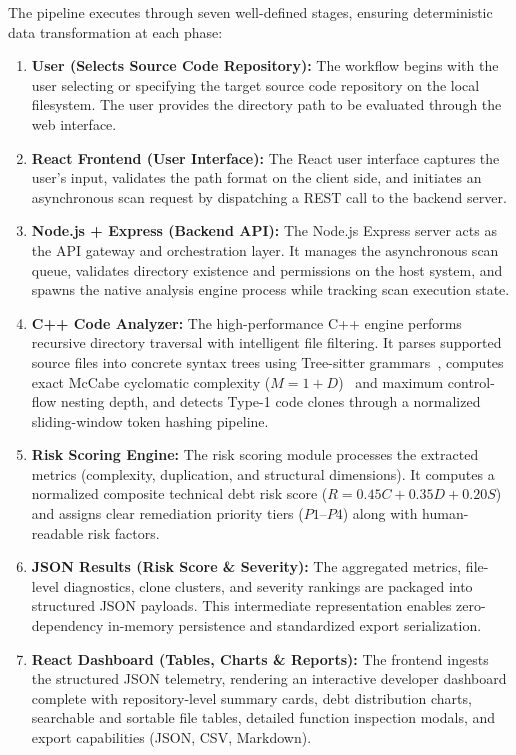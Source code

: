 The pipeline executes through seven well-defined stages, ensuring deterministic data transformation at each phase:
\begin{enumerate}
    \item \textbf{User (Selects Source Code Repository):} The workflow begins with the user selecting or specifying the target source code repository on the local filesystem. The user provides the directory path to be evaluated through the web interface.
    \item \textbf{React Frontend (User Interface):} The React user interface captures the user's input, validates the path format on the client side, and initiates an asynchronous scan request by dispatching a REST call to the backend server.
    \item \textbf{Node.js + Express (Backend API):} The Node.js Express server acts as the API gateway and orchestration layer. It manages the asynchronous scan queue, validates directory existence and permissions on the host system, and spawns the native analysis engine process while tracking scan execution state.
    \item \textbf{C++ Code Analyzer:} The high-performance C++ engine performs recursive directory traversal with intelligent file filtering. It parses supported source files into concrete syntax trees using Tree-sitter grammars~\cite{treesitter}, computes exact McCabe cyclomatic complexity ($M = 1 + D$)~\cite{mccabe1976} and maximum control-flow nesting depth, and detects Type-1 code clones through a normalized sliding-window token hashing pipeline.
    \item \textbf{Risk Scoring Engine:} The risk scoring module processes the extracted metrics (complexity, duplication, and structural dimensions). It computes a normalized composite technical debt risk score ($R = 0.45C + 0.35D + 0.20S$) and assigns clear remediation priority tiers ($P1$--$P4$) along with human-readable risk factors.
    \item \textbf{JSON Results (Risk Score \& Severity):} The aggregated metrics, file-level diagnostics, clone clusters, and severity rankings are packaged into structured JSON payloads. This intermediate representation enables zero-dependency in-memory persistence and standardized export serialization.
    \item \textbf{React Dashboard (Tables, Charts \& Reports):} The frontend ingests the structured JSON telemetry, rendering an interactive developer dashboard complete with repository-level summary cards, debt distribution charts, searchable and sortable file tables, detailed function inspection modals, and export capabilities (JSON, CSV, Markdown).
\end{enumerate}

